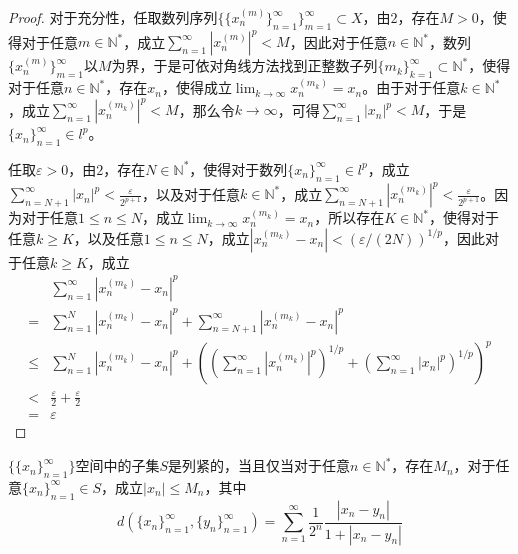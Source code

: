\documentclass[lang = cn, scheme = chinese, 10pt]{elegantbook}
\newcommand{\N}{\mathbb{N}}  %
\newcommand{\sub}{\subset}   %
\begin{document}
\begin{proof}
	对于充分性，任取数列序列$\{ \{x_n^{(m)}\}_{n=1}^\infty \}_{m=1}^{\infty}\sub X$，由$2$，存在$M>0$，使得对于任意$m\in\N^*$，成立$\displaystyle\sum_{n=1}^{\infty}|x_n^{(m)}|^p<M$，因此对于任意$n\in\N^*$，数列$\{x_n^{(m)}\}_{m=1}^{\infty}$以$M$为界，于是可依对角线方法找到正整数子列$\{m_k\}_{k=1}^{\infty}\sub\N^*$，使得对于任意$n\in\N^*$，存在$x_n$，使得成立$\displaystyle\lim_{k\to\infty}x_n^{(m_k)}=x_n$。由于对于任意$k\in\N^*$，成立$\displaystyle\sum_{n=1}^{\infty}|x_n^{(m_k)}|^p<M$，那么令$k\to\infty$，可得$\displaystyle\sum_{n=1}^{\infty}|x_n|^p<M$，于是$\{x_n\}_{n=1}^{\infty}\in l^p$。
	
	任取$\varepsilon>0$，由$2$，存在$N\in\N^*$，使得对于数列$\{x_n\}_{n=1}^{\infty}\in l^p$，成立$\displaystyle\sum_{n=N+1}^{\infty}|x_n|^p<\frac{\varepsilon}{2^{p+1}}$，以及对于任意$k\in\N^*$，成立$\displaystyle\sum_{n=N+1}^{\infty}|x_n^{(m_k)}|^p<\frac{\varepsilon}{2^{p+1}}$。因为对于任意$1\le n\le N$，成立$\displaystyle\lim_{k\to\infty}x_n^{(m_k)}=x_n$，所以存在$K\in\N^*$，使得对于任意$k\ge K$，以及任意$1\le n\le N$，成立$|x_n^{(m_k)}-x_n|<(\varepsilon/(2N))^{1/p}$，因此对于任意$k\ge K$，成立
	\nonumber\begin{align}
		& \sum_{n=1}^{\infty}|x_n^{(m_k)}-x_n|^p\\
		= & \sum_{n=1}^{N}|x_n^{(m_k)}-x_n|^p+\sum_{n=N+1}^{\infty}|x_n^{(m_k)}-x_n|^p\\
		\le & \sum_{n=1}^{N}|x_n^{(m_k)}-x_n|^p+\left(\left( \sum_{n=1}^{\infty}|x_n^{(m_k)}|^p \right)^{1/p}+\left( \sum_{n=1}^{\infty}|x_n|^p \right)^{1/p}\right)^p\\
		< & \frac{\varepsilon}{2}+\frac{\varepsilon}{2}\\
		= & \varepsilon
	\end{align}
\end{proof}

\begin{proposition}
	$\{\{x_n\}_{n=1}^{\infty}\}$空间中的子集$S$是列紧的，当且仅当对于任意$n\in\N^*$，存在$M_n$，对于任意$\{x_n\}_{n=1}^{\infty}\in S$，成立$|x_n|\le M_n$，其中
	$$
	d(\{x_n\}_{n=1}^{\infty},\{y_n\}_{n=1}^{\infty})=\sum_{n=1}^{\infty}\frac{1}{2^n}\frac{|x_n-y_n|}{1+|x_n-y_n|}
	$$
\end{proposition}
\end{document}

